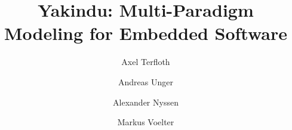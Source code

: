 \documentclass{llncs}
\begin{document}
%
\pagestyle{headings}  %


\title{Yakindu: Multi-Paradigm Modeling for Embedded Software}

%
%
\author{Axel Terfloth \and Andreas Unger \and Alexander
Nyssen \and Markus Voelter}
%
%

\maketitle              %

\begin{abstract}
 
\end{abstract}




 

\end{document}
